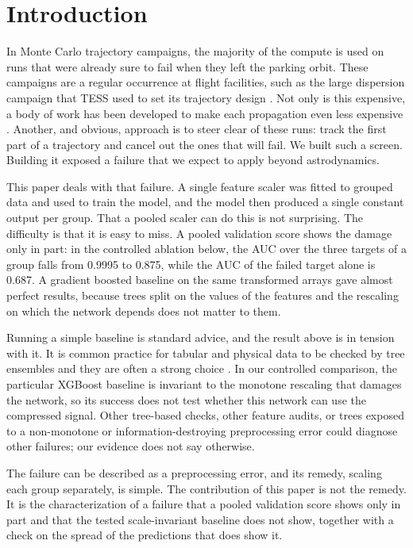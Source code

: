\documentclass[preprint,12pt,authoryear,doubleblind]{elsarticle}
\begin{document}
\section{Introduction}
\label{sec:intro}

In Monte Carlo trajectory campaigns, the majority of the compute is used on runs that were already sure to fail when they left the parking orbit. These campaigns are a regular occurrence at flight facilities, such as the large dispersion campaign that TESS used to set its trajectory design \citep{nickel2016}. Not only is this expensive, a body of work has been developed to make each propagation even less expensive \citep{massari2017,jia2022}. Another, and obvious, approach is to steer clear of these runs: track the first part of a trajectory and cancel out the ones that will fail. We built such a screen. Building it exposed a failure that we expect to apply beyond astrodynamics.

This paper deals with that failure. A single feature scaler was fitted to grouped data and used to train the model, and the model then produced a single constant output per group. That a pooled scaler can do this is not surprising. The difficulty is that it is easy to miss. A pooled validation score shows the damage only in part: in the controlled ablation below, the AUC over the three targets of a group falls from 0.9995 to 0.875, while the AUC of the failed target alone is 0.687. A gradient boosted baseline on the same transformed arrays gave almost perfect results, because trees split on the values of the features and the rescaling on which the network depends does not matter to them.

Running a simple baseline is standard advice, and the result above is in tension with it. It is common practice for tabular and physical data to be checked by tree ensembles and they are often a strong choice \citep{chen2016,grinsztajn2022,shwartz2022}. In our controlled comparison, the particular XGBoost baseline is invariant to the monotone rescaling that damages the network, so its success does not test whether this network can use the compressed signal. Other tree-based checks, other feature audits, or trees exposed to a non-monotone or information-destroying preprocessing error could diagnose other failures; our evidence does not say otherwise.

The failure can be described as a preprocessing error, and its remedy, scaling each group separately, is simple. The contribution of this paper is not the remedy. It is the characterization of a failure that a pooled validation score shows only in part and that the tested scale-invariant baseline does not show, together with a check on the spread of the predictions that does show it.
\end{document}
